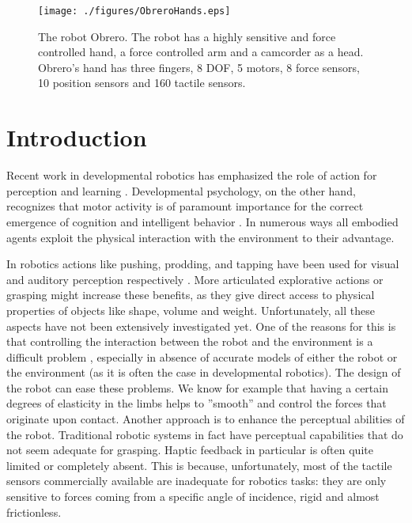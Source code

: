 \begin{figure}[tbp]
\centerline{
\texttt{[image: ./figures/ObreroHands.eps]}
} \caption{The robot Obrero. The robot has a highly sensitive and
force controlled hand, a force controlled arm and a
camcorder as a head. Obrero's hand  has three fingers, 8 DOF, 5
motors, 8 force sensors, 10 position sensors and 160 tactile
sensors.} \label{fig:RobotObrero}
\end{figure}
%
\section{Introduction}
%
Recent work in developmental robotics has emphasized the role of
action for perception and learning
\cite{metta03early,natale04learning,natale05from}. Developmental
psychology, on the other hand, recognizes that motor activity is of
paramount importance for the correct emergence of cognition and
intelligent behavior \cite{gibson88explore,streri93Seeing,bushnell93motor,hofsten04motor}.
In numerous ways all embodied agents exploit the physical interaction 
with the environment to their advantage. 

In robotics actions like pushing, prodding, and tapping
have been used for visual and auditory perception respectively
\cite{metta03early,etorresjara05tapping}. More articulated
explorative actions or grasping might increase these benefits, as
they give direct access to physical properties of objects like
shape, volume and weight.
%
Unfortunately, all these aspects have not been extensively
investigated yet. One of the reasons for this is that controlling
the interaction between the robot and the environment is a
difficult problem \cite{volpe90real}, especially in absence of
accurate models of either the robot or the environment (as it is
often the case in developmental robotics).
%
The design of the robot can ease these problems. We know for
example that having a certain degrees of elasticity in the limbs
helps to ''smooth''  and control the forces that originate upon
contact. Another approach is to enhance the perceptual abilities
of the robot. Traditional robotic systems in fact have perceptual
capabilities that do not seem adequate for grasping. Haptic feedback in
particular is often quite limited or completely absent. This is
because, unfortunately, most of the tactile sensors commercially
available are inadequate for robotics tasks: they are only
sensitive to forces coming from a specific angle of incidence,
rigid and almost frictionless.


